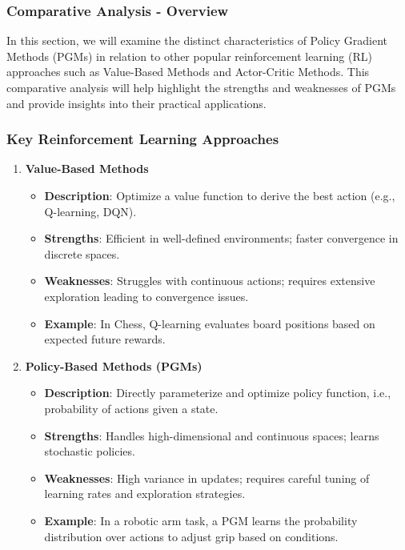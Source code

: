 \documentclass[aspectratio=169]{beamer}
\begin{document}
\begin{frame}[fragile]
    \frametitle{Comparative Analysis - Overview}
    In this section, we will examine the distinct characteristics of Policy Gradient Methods (PGMs) in relation to other popular reinforcement learning (RL) approaches such as Value-Based Methods and Actor-Critic Methods. This comparative analysis will help highlight the strengths and weaknesses of PGMs and provide insights into their practical applications.
\end{frame}

\begin{frame}[fragile]
    \frametitle{Key Reinforcement Learning Approaches}
    \begin{enumerate}
        \item \textbf{Value-Based Methods}
            \begin{itemize}
                \item \textbf{Description}: Optimize a value function to derive the best action (e.g., Q-learning, DQN).
                \item \textbf{Strengths}: Efficient in well-defined environments; faster convergence in discrete spaces.
                \item \textbf{Weaknesses}: Struggles with continuous actions; requires extensive exploration leading to convergence issues.
                \item \textbf{Example}: In Chess, Q-learning evaluates board positions based on expected future rewards.
            \end{itemize}
            
        \item \textbf{Policy-Based Methods (PGMs)}
            \begin{itemize}
                \item \textbf{Description}: Directly parameterize and optimize policy function, i.e., probability of actions given a state.
                \item \textbf{Strengths}: Handles high-dimensional and continuous spaces; learns stochastic policies.
                \item \textbf{Weaknesses}: High variance in updates; requires careful tuning of learning rates and exploration strategies.
                \item \textbf{Example}: In a robotic arm task, a PGM learns the probability distribution over actions to adjust grip based on conditions.
            \end{itemize}
    \end{enumerate}
\end{frame}
\end{document}
